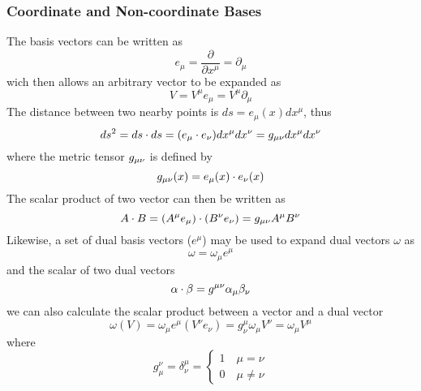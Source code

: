 \subsubsection{Coordinate and Non-coordinate Bases}
The basis vectors can be written as
\begin{equation}
e_\mu=\frac{\partial}{\partial x^\mu}=\partial_\mu
\end{equation}
wich then allows an arbitrary vector to be expanded as
\begin{equation}
V=V^\mu e_\mu=V^\mu\partial_\mu
\end{equation}
The distance between two nearby points is $ds=e_\mu(x) dx^\mu$, thus
\begin{equation}
ds^2=ds\cdot ds=(e_\mu\cdot e_\nu)dx^\mu dx^\nu=g_{\mu\nu} dx^\mu dx^\nu
\end{equation}
where the metric tensor $g_{\mu\nu}$ is defined by
\begin{equation}
g_{\mu\nu}(x)=e_\mu(x)\cdot e_\nu(x)
\end{equation}
The scalar product of two vector can then be written as
\begin{equation}
A\cdot B=(A^\mu e_\mu)\cdot(B^\nu e_\nu)=g_{\mu\nu} A^\mu B^\nu
\end{equation}
Likewise, a set of dual basis vectors ($e^\mu$) may be used to expand dual vectors $\omega$ as
\begin{equation}
\omega=\omega_\mu e^\mu
\end{equation}
and the scalar of two dual vectors
\begin{equation}
\alpha\cdot\beta=g^{\mu\nu}\alpha_\mu\beta_\nu
\end{equation}
we can also calculate the scalar product between a vector and a dual vector
\begin{equation}
\omega(V)=\omega_\mu e^\mu(V^\nu e_\nu)=g_\nu^\mu\omega_\mu V^\nu =\omega_\mu V^\mu
\end{equation}
where
\begin{equation}
g^\nu_\mu=\delta_\nu^\mu=
\begin{cases}
1\quad\mu=\nu\\
0\quad\mu\neq\nu
\end{cases}
\end{equation}